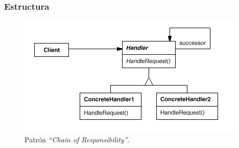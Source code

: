     \subsubsection{Estructura}

    \begin{figure}[!h]
        \centering
        \includegraphics[scale=0.8]{images/chain-of-responsibility}
        \caption{Patrón \textit{``Chain of Responsibility''}.} \label{chain_pattern_img}
    \end{figure}